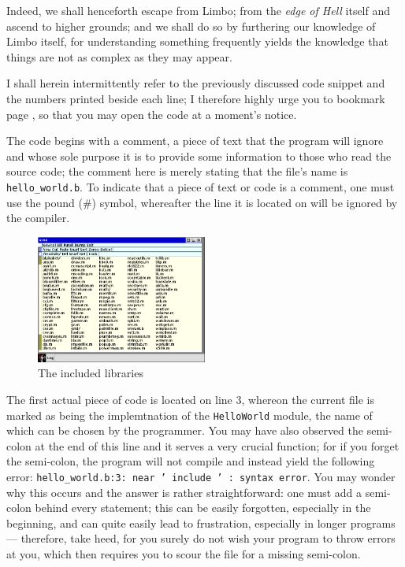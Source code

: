 \documentclass[a5paper,twoside,12pt]{report}
\begin{document}
Indeed, we shall henceforth escape from Limbo; from the \textit{edge of Hell} itself and ascend to higher grounds; and we shall do so by furthering our knowledge of Limbo itself, for understanding something frequently yields the knowledge that things are not as complex as they may appear.

I shall herein intermittently refer to the previously discussed code snippet and the numbers printed beside each line; I therefore highly urge you to bookmark page \pageref{hello-world}, so that you may open the code at a moment's notice.

The code begins with a comment, a piece of text that the program will ignore and whose sole purpose it is to provide some information to those who read the source code; the comment here is merely stating that the file's name is \texttt{hello\_world.b}. To indicate that a piece of text or code is a comment, one must use the pound (\#) symbol, whereafter the line it is located on will be ignored by the compiler.

\begin{figure}
  \centering
  \includegraphics[width=0.5\textwidth]{imgs/modules.png}
  \caption{The included libraries}
\end{figure}

The first actual piece of code is located on line 3, whereon the current file is marked as being the implemtnation of the \texttt{HelloWorld} module, the name of which can be chosen by the programmer. You may have also observed the semi-colon at the end of this line and it serves a very crucial function; for if you forget the semi-colon, the program will not compile and instead yield the following error: \texttt{hello\_world.b:3: near ' include ' : syntax error}. You may wonder why this occurs and the answer is rather straightforward: one must add a semi-colon behind every statement; this can be easily forgotten, especially in the beginning, and can quite easily lead to frustration, especially in longer programs — therefore, take heed, for you surely do not wish your program to throw errors at you, which then requires you to scour the file for a missing semi-colon.
\end{document}
